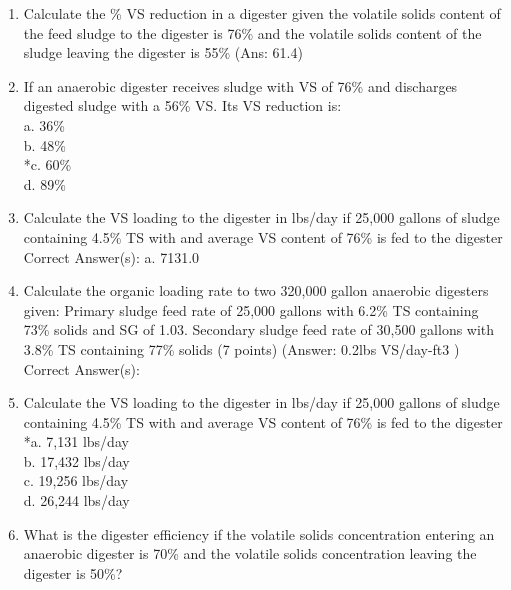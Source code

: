 \begin{enumerate}
\item  Calculate the \% VS reduction in a digester given the volatile solids content of the feed sludge to the digester is 76\% and the volatile solids content of the sludge leaving the digester is 55\% (Ans: 61.4)\\

\item  If an anaerobic digester receives sludge with VS of 76\% and discharges digested sludge with a 56\% VS.  Its VS reduction is:\\

a. 36\% \\
b. 48\% \\
*c. 60\% \\
d. 89\% \\

\item  Calculate the VS loading to the digester in lbs/day if 25,000 gallons of sludge containing 4.5\% TS with and average VS content of 76\% is fed to the digester \\

Correct Answer(s):
a. 7131.0 \\

\item  Calculate the organic loading rate to two 320,000 gallon anaerobic digesters given:
Primary sludge feed rate of 25,000 gallons with 6.2\% TS containing 73\% solids and SG of 1.03.
Secondary sludge feed rate of 30,500 gallons with 3.8\% TS containing 77\% solids (7 points)
(Answer: 0.2lbs VS/day-ft3 ) \\

Correct Answer(s): \\


\item  Calculate the VS loading to the digester in lbs/day if 25,000 gallons of sludge containing 4.5\% TS with and average VS content of 76\% is fed to the digester \\

*a. 7,131 lbs/day \\
b. 17,432 lbs/day \\
c. 19,256 lbs/day \\
d. 26,244 lbs/day \\

\item  What is the digester efficiency if the volatile solids concentration entering an anaerobic digester is 70\% and the volatile solids concentration leaving the digester is 50\%? \\


\end{enumerate}

